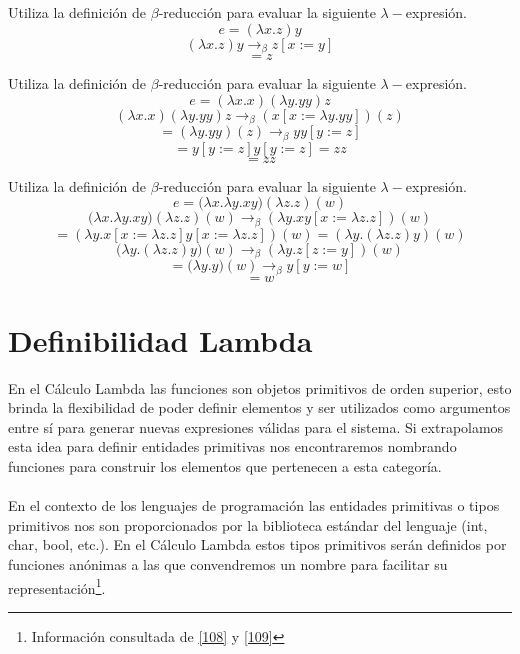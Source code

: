     \begin{exercise}
    Utiliza la definición de $\beta$-reducción para evaluar la siguiente $\lambda-$expresión.
    $$e= (\lambda x.z)y$$
    \[ (\lambda x.z)y \rightarrow_\beta  z [x := y]\]
    \[ = z \]
    \end{exercise}

    \begin{exercise}
        Utiliza la definición de $\beta$-reducción para evaluar la siguiente $\lambda-$expresión.
        $$e = (\lambda x.x)(\lambda y.yy) z$$
        \[ (\lambda x.x)(\lambda y.yy) z \rightarrow_\beta (x[x:=\lambda y.yy])(z)\]
        \[ = (\lambda y.yy)(z) \rightarrow_\beta yy[y:=z]\]
        \[ =  y[y:=z]y[y:=z] = zz\]
       \[= zz \]
    \end{exercise}

    \begin{exercise}
        Utiliza la definición de $\beta$-reducción para evaluar la siguiente $\lambda-$expresión.
        $$e= \big(\lambda x.\lambda y.xy\big)(\lambda z.z)(w)$$
        \[\big(\lambda x.\lambda y.xy\big)(\lambda z.z)(w) \rightarrow_\beta (\lambda y.xy[x := \lambda z.z])(w) \]
        \[ =  (\lambda y.x[x := \lambda z.z]y[x := \lambda z.z])(w) = (\lambda y.(\lambda z.z)y)(w) \]
        \[ \big(\lambda y.(\lambda z.z)y\big)(w) \rightarrow_\beta (\lambda y.z[z := y])(w) \]
        \[ = \big(\lambda y.y\big)(w) \rightarrow_\beta y[y := w] \]
        \[ = w \]
    \end{exercise}

    \section{Definibilidad Lambda}
    En el Cálculo Lambda las funciones son objetos primitivos de orden superior, esto brinda la flexibilidad de poder definir elementos y ser utilizados como argumentos entre sí para generar nuevas expresiones válidas para el sistema. Si extrapolamos esta idea para definir entidades primitivas nos encontraremos nombrando funciones para construir los elementos que pertenecen a esta categoría.\\\\
 En el contexto de los lenguajes de programación las entidades primitivas o tipos primitivos nos son proporcionados por la biblioteca estándar del lenguaje (\textsf{int}, \textsf{char}, \textsf{boo}l, etc.). En el Cálculo Lambda estos tipos primitivos serán definidos por funciones anónimas a las que convendremos un nombre para facilitar su representación\footnote{Información consultada de \hyperlink{108}{[108]} y  \hyperlink{109}{[109]}}.

